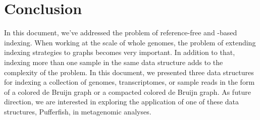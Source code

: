 \chapter{Conclusion}

In this document, we’ve addressed the problem of reference-free and -based indexing.
When working at the scale of whole genomes,
the problem of extending indexing strategies to graphs becomes very important.
In addition to that, indexing more than one sample in the same data structure
adds to the complexity of the problem.
In this document, we presented three data structures
for indexing a collection of genomes, transcriptomes, or sample reads
in the form of a colored de Bruijn graph or a compacted colored de Bruijn graph.
As future direction, we are interested in exploring the application
of one of these data structures, Pufferfish, in metagenomic analyses.


